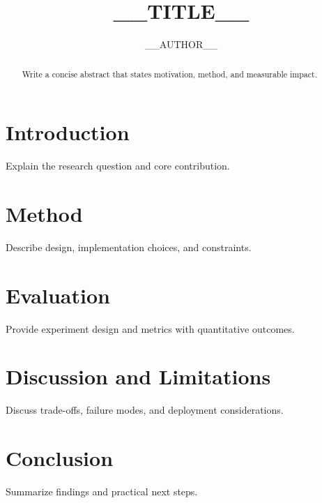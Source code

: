 \documentclass[sigconf]{acmart}
\title{__TITLE__}
\author{__AUTHOR__}
\affiliation{
  \institution{Institution Name}
  \city{City}
  \country{Country}
}
\begin{document}
\begin{abstract}
Write a concise abstract that states motivation, method, and measurable impact.
\end{abstract}

\maketitle

\section{Introduction}
Explain the research question and core contribution.

\section{Method}
Describe design, implementation choices, and constraints.

\section{Evaluation}
Provide experiment design and metrics with quantitative outcomes.

\section{Discussion and Limitations}
Discuss trade-offs, failure modes, and deployment considerations.

\section{Conclusion}
Summarize findings and practical next steps.



\end{document}
